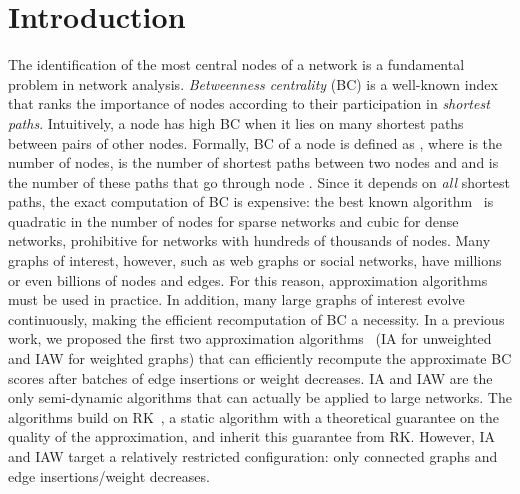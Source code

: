 \documentclass[english]{llncs}
\newcommand{\rk}{\textsf{RK}\xspace}
\newcommand{\ia}{\textsf{IA}\xspace}
\newcommand{\iaw}{\textsf{IAW}\xspace}
\begin{document}
\section{Introduction}
\label{sec:intro}
The identification of the most central nodes of a network is a fundamental problem in network analysis. \emph{Betweenness
centrality} (BC) is a well-known index that ranks the importance of nodes according to their participation in \textit{shortest paths}. Intuitively, a node has 
high BC when it lies on many shortest paths between pairs of other nodes.
Formally, BC of a node  is defined as , where  is the number of nodes,
 is the number of shortest paths between two nodes  and  and  is the number of these paths that go through node .
Since it depends on \textit{all} shortest paths, the exact computation of BC is expensive: the best known 
algorithm~\cite{Brandes01betweennessCentrality} is quadratic in the number of nodes for sparse networks and cubic for dense networks, prohibitive for networks with hundreds of thousands of nodes. Many graphs of interest, however, such as web 
graphs or social networks, have millions or even billions of nodes and edges. 
For this reason, approximation algorithms~\cite{DBLP:journals/ijbc/BrandesP07,DBLP:conf/alenex/GeisbergerSS08,DBLP:conf/waw/BaderKMM07} must be used in practice. In addition, many
large graphs of interest evolve continuously, making the efficient recomputation of BC a necessity.
In a previous work, we proposed the first two approximation algorithms~\cite{DBLP:conf/alenex/BergaminiMS15} (\ia for unweighted and \iaw for weighted graphs) 
that can efficiently recompute the approximate BC scores after batches of edge insertions or weight decreases. 
\ia and \iaw are the only semi-dynamic algorithms that can actually be applied to large networks. 
The algorithms build on \rk~\cite{DBLP:conf/wsdm/RiondatoK14}, a static algorithm with a theoretical guarantee on the quality of the approximation, and inherit this guarantee from \rk. 
However, \ia and \iaw target a relatively restricted configuration: only connected graphs and edge insertions/weight decreases.
\vspace{-1ex}
\end{document}
